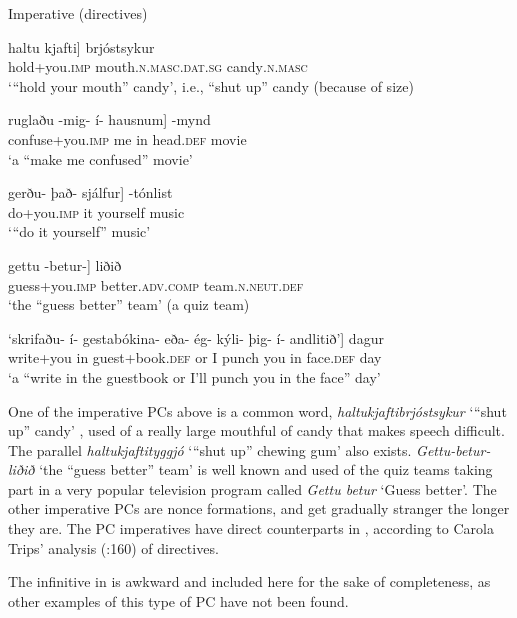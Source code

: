 \documentclass[output=paper]{LSP/langsci}
\begin{document}
\begin{xlist}
\ea%
 \label{ex:bjarnadottir:28} 
 Imperative (directives)

\ea \label{ex:bjarnadottir:28a} 
\gll {\ob}haltu kjafti] brjóstsykur\\
 hold+you\textsc{.imp} mouth\textsc{.n.masc.dat.sg} candy\textsc{.n.masc}\\
\glt ‘“hold your mouth” candy’, i.e., “shut up” candy (because of size)

\ex \label{ex:bjarnadottir:28b} 
\gll {\ob}ruglaðu -mig- í- hausnum] -mynd\\
 confuse+you\textsc{.imp} me in head.\textsc{def} movie\\
\glt ‘a “make me confused” movie’

\ex \label{ex:bjarnadottir:28c} 
\gll {\ob}gerðu- það- sjálfur] -tónlist\\
 do+you\textsc{.imp} it yourself music\\
\glt ‘“do it yourself” music’

\ex \label{ex:bjarnadottir:28d} 
\gll {\ob}gettu -betur-] liðið\\
 guess+you\textsc{.imp} better\textsc{.adv.comp} team\textsc{.n.neut.def}\\
\glt ‘the “guess better” team’  (a quiz team)

\ex \label{ex:bjarnadottir:28e} 
\gll {\ob}‘skrifaðu- í- gestabókina- eða- ég- kýli- þig- í- andlitið’] dagur\\
 write+you in guest+book\textsc{.def} or I punch you in face\textsc{.def} day\\
\glt ‘a “write in the guestbook or I’ll punch you in the face” day’
\z
\z

One of the imperative PCs above is a common word, \textit{haltukjaftibrjóstsykur} ‘“shut up” candy’ , used of a really large mouthful of candy that makes speech difficult. The parallel \textit{haltukjaftityggjó} ‘“shut up” chewing gum’ also exists. \textit{Gettu-betur-liðið} ‘the “guess better” team’  is well known and used of the quiz teams taking part in a very popular television program called \textit{Gettu betur} ‘Guess better’. The other imperative PCs are nonce formations, and get gradually stranger the longer they are. The  PC imperatives have direct counterparts in , according to Carola Trips’ analysis (\citeyear{Trips2016}:160) of  directives.

The infinitive in  is awkward and included here for the sake of completeness, as other examples of this type of PC have not been found. 


\end{xlist}
\end{document}
